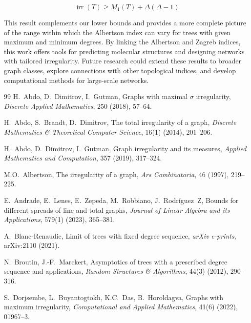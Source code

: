 \documentclass[12pt]{amsart}
\newcommand{\irr}{\operatorname{irr}}
\begin{document}
\begin{equation}
\irr(T) \geq M_1(T) + \Delta(\Delta - 1)
\end{equation}

This result complements our lower bounds and provides a more complete picture of the range within which the Albertson index can vary for trees with given maximum and minimum degrees. By linking the Albertson and Zagreb indices, this work offers tools for predicting molecular structures and designing networks with tailored irregularity. Future research could extend these results to broader graph classes, explore connections with other topological indices, and develop computational methods for large-scale networks. 


\begin{thebibliography}{99}
H.~Abdo, D.~Dimitrov, I.~Gutman,
\newblock Graphs with maximal $\sigma$ irregularity,
\newblock \emph{Discrete Applied Mathematics}, 250 (2018), 57–64.

H.~Abdo, S.~Brandt, D.~Dimitrov,
\newblock The total irregularity of a graph,
\newblock \emph{Discrete Mathematics \& Theoretical Computer Science}, 16(1) (2014), 201–206.

H.~Abdo, D.~Dimitrov, I.~Gutman,
\newblock Graph irregularity and its measures,
\newblock \emph{Applied Mathematics and Computation}, 357 (2019), 317–324.

M.O.~Albertson,
\newblock The irregularity of a graph,
\newblock \emph{Ars Combinatoria}, 46 (1997), 219–225.

E.~Andrade, E.~Lenes, E.~Zepeda, M.~Robbiano, J.~Rodríguez~Z,
\newblock Bounds for different spreads of line and total graphs,
\newblock \emph{Journal of Linear Algebra and its Applications}, 579(1) (2023), 365–381.

A.~Blanc-Renaudie,
\newblock Limit of trees with fixed degree sequence,
\newblock \emph{arXiv e-prints}, arXiv:2110 (2021).

N.~Broutin, J.-F.~Marckert,
\newblock Asymptotics of trees with a prescribed degree sequence and applications,
\newblock \emph{Random Structures \& Algorithms}, 44(3) (2012), 290–316.

S.~Dorjsembe, L.~Buyantogtokh, K.C.~Das, B.~Horoldagva,
\newblock Graphs with maximum irregularity,
\newblock \emph{Computational and Applied Mathematics}, 41(6) (2022), 01967–3.


\end{thebibliography}
\end{document}
